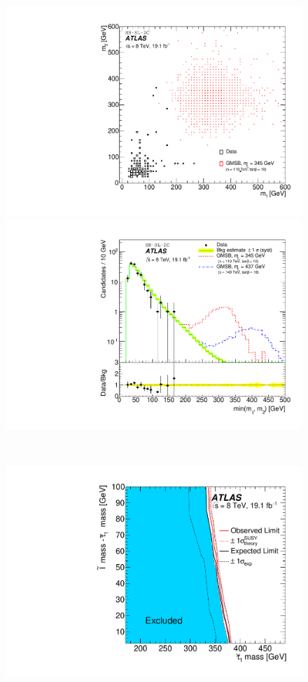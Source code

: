 \begin{figure}[H]
    \begin{minipage}{0.49\hsize}
    \centering   
    \includegraphics[width=\textwidth]{img/stau/fig_02a.pdf}
    \subcaption{}
    \end{minipage}
    \begin{minipage}{0.49\hsize}
    \centering   
    \includegraphics[width=\textwidth]{img/stau/fig_02b.pdf}
    \subcaption{}
    \end{minipage}\\
    \begin{minipage}{0.49\hsize}
    \centering   
    \includegraphics[width=\textwidth]{img/stau/fig_06a.pdf}

\end{minipage}
\end{figure}
